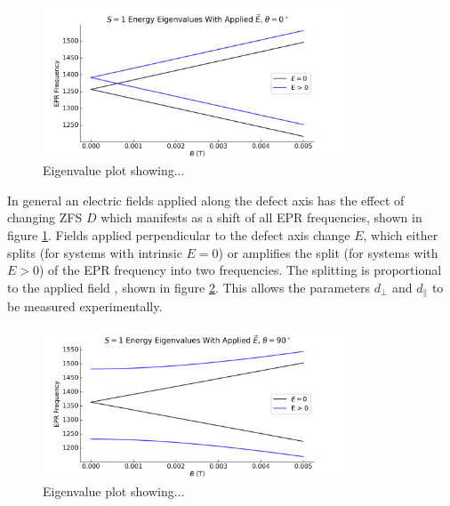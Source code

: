 \begin{figure}[h]
    \begin{center}
        \includegraphics[width=0.8\textwidth]{figures/EFieldParallel.png}
    \end{center}
    \caption{Eigenvalue plot showing...} \label{fig:E_Field_par}
\end{figure}

In general an electric fields applied along the defect axis has the effect of changing ZFS $D$ which manifests as a shift of all EPR frequencies, shown in figure \ref{fig:E_Field_par}. Fields applied perpendicular to the defect axis change $E$, which either splits (for systems with intrinsic $E=0$) or amplifies the split (for systems with $E>0$) of the EPR frequency into two frequencies. The splitting is proportional to the applied field \cite{Acosta2012, Bassett2011}, shown in figure \ref{fig:E_Field_perp}. This allows the parameters $d_\perp$ and $d_\parallel$ to be measured experimentally. 

\begin{figure}[h]
    \begin{center}
        \includegraphics[width=0.8\textwidth]{figures/EFieldPerp.png}
    \end{center}
    \caption{Eigenvalue plot showing...}\label{fig:E_Field_perp}
\end{figure}




